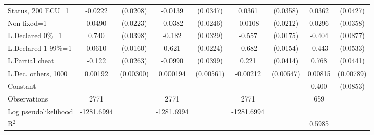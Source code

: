 \begin{tabular}{l|cccccc|cc}
Status, 200 ECU=1&  -0.0222         & (0.0208)&  -0.0139         & (0.0347)&   0.0361         & (0.0358)&   0.0362         & (0.0427)\\
Non-fixed=1     &   0.0490\sym{**} & (0.0223)&  -0.0382         & (0.0246)&  -0.0108         & (0.0212)&   0.0296         & (0.0358)\\
L.Declared 0\%=1&    0.740\sym{***}& (0.0398)&   -0.182\sym{***}& (0.0329)&   -0.557\sym{***}& (0.0175)&   -0.404\sym{***}& (0.0877)\\
L.Declared 1-99\%=1&   0.0610\sym{***}& (0.0160)&    0.621\sym{***}& (0.0224)&   -0.682\sym{***}& (0.0154)&   -0.443\sym{***}& (0.0533)\\
L.Partial cheat &   -0.122\sym{***}& (0.0263)&  -0.0990\sym{**} & (0.0399)&    0.221\sym{***}& (0.0414)&    0.768\sym{***}& (0.0441)\\
L.Dec. others, 1000&  0.00192         &(0.00300)& 0.000194         &(0.00561)& -0.00212         &(0.00547)&  0.00815         &(0.00789)\\
Constant        &                  &         &                  &         &                  &         &    0.400\sym{***}& (0.0853)\\
\hline
Observations    &     2771         &         &     2771         &         &     2771         &         &      659         &         \\
Log pseudolikelihood  & -1281.6994   &         &    -1281.6994               &         &       -1281.6994            &         &           &   \\ 
R$^2$      &                  &         &                  &         &                  &         &        0.5985        &   \\ 


\end{tabular}

